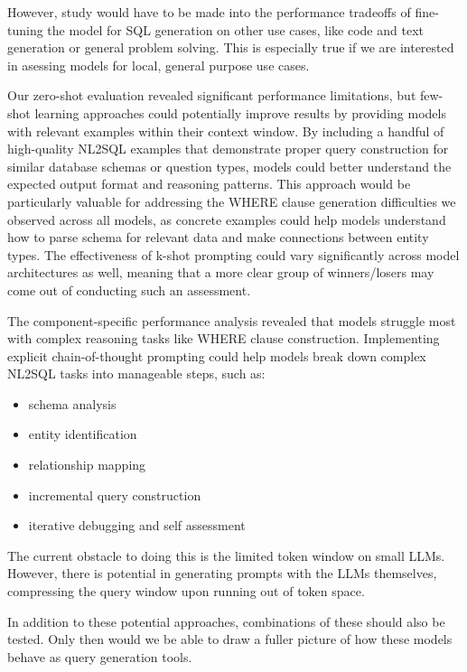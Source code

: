 \documentclass[sigconf]{acmart}
\begin{document}
However, study would have to be made into the performance tradeoffs of fine-tuning the model for SQL generation on
other use cases, like code and text generation or general problem solving. This is especially true if we are interested
in asessing models for local, general purpose use cases. 

Our zero-shot evaluation revealed significant performance limitations, but few-shot learning approaches could 
potentially improve results by providing models with relevant examples within their context window. By including a handful
of high-quality NL2SQL examples that demonstrate proper query construction for similar database schemas or question 
types, models could better understand the expected output format and reasoning patterns. This approach would be 
particularly valuable for addressing the WHERE clause generation difficulties we observed across all models, as concrete 
examples could help models understand how to parse schema for relevant data and make connections between entity types. 
The effectiveness of k-shot prompting could vary significantly across model architectures as well, meaning that a more
clear group of winners/losers may come out of conducting such an assessment.

The component-specific performance analysis revealed that models struggle most with complex reasoning tasks like WHERE 
clause construction. Implementing explicit chain-of-thought prompting could help models break down complex 
NL2SQL tasks into manageable steps, such as:


\begin{itemize}
  \item schema analysis 
  \item entity identification 
  \item relationship mapping 
  \item incremental query construction
  \item iterative debugging and self assessment
\end{itemize}

The current obstacle to doing this is the limited token window on small LLMs. However, there is potential
in generating prompts with the LLMs themselves, compressing the query window upon running out of token space.

In addition to these potential approaches, combinations of these should also be tested. Only then would we be able to 
draw a fuller picture of how these models behave as query generation tools.
\end{document}
